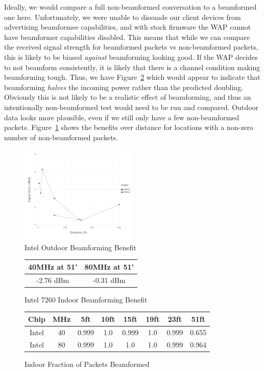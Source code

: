 Ideally, we would compare a full non-beamformed conversation to a
beamformed one here. Unfortunately, we were unable to dissuade our
client devices from advertising beamformee capabilities, and with
stock firmware the WAP cannot have beamformer capabilities disabled.
This means that while we can compare the received signal strength for
beamformed packets vs non-beamformed packets, this is likely to be
biased \emph{against} beamforming looking good. If the WAP decides to
not beamform consistently, it is likely that there is a channel
condition making beamforming tough.   Thus, we have Figure~\ref{fig:intelindoorbeamresult}
which would appear to indicate that beamforming \emph{halves} the
incoming power rather than the predicted doubling. Obviously this is
not likely to be a realistic effect of beamforming, and thus an
intentionally non-beamformed test would need to be run and
compared. Outdoor data looks more plausible, even if we still only
have a few non-beamformed
packets. Figure~\ref{fig:inteloutdoorbeambenefit} shows the benefits
over distance for locations with a non-zero number of non-beamformed
packets.
\begin{figure}[!h]
\centering
\includegraphics[width=0.5\textwidth]{figures/Intel_Outside_Beamforming_Benefit}
\caption{Intel Outdoor Beamforming Benefit}
\label{fig:inteloutdoorbeambenefit}
\end{figure}

\begin{figure}[h!]
\centering
\begin{tabular}{| c | c |}
\hline
40MHz at 51' & 80MHz at 51'\\ \hline
-2.76 dBm &  -0.31 dBm\\ \hline
\end{tabular}
\caption{Intel 7260 Indoor Beamforming Benefit}
\label{fig:intelindoorbeamresult}
\end{figure}

\begin{figure}[b!]
\centering
\begin{tabular}{| c | c || c | c | c | c | c | c |}
\hline
Chip & MHz & 5ft & 10ft & 15ft & 19ft & 23ft & 51ft\\ \hline
Intel & 40 & 0.999 & 1.0 & 0.999 & 1.0 & 0.999 & 0.655\\ \hline
Intel & 80 & 0.999 & 1.0 & 1.0 & 1.0 & 0.999 & 0.964\\ \hline
\end{tabular}
\caption{Indoor Fraction of Packets Beamformed}
\label{fig:indoorbeampercent}
\end{figure}


